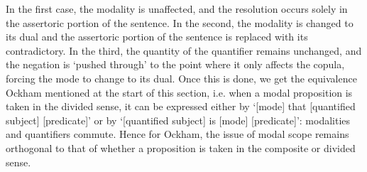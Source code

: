 \documentclass[a4paper]{article}
\begin{document}
In the first case, the modality is unaffected, and the resolution occurs solely in the assertoric portion of the sentence. In the second, the modality is changed to its dual and the assertoric portion of the sentence is replaced with its contradictory. In the third, the quantity of the quantifier remains unchanged, and the negation is `pushed through' to the point where it only affects the copula, forcing the mode to change to its dual. Once this is done, we get the equivalence Ockham mentioned at the start of this section, i.e.  when a modal proposition is taken in the divided sense, it can be expressed either by `[mode] that [quantified subject] [predicate]' or by `[quantified subject] is [mode] [predicate]': modalities and quantifiers commute. Hence for Ockham, the issue of modal scope remains orthogonal to that of whether a proposition is taken in the composite or divided sense.
\end{document}
